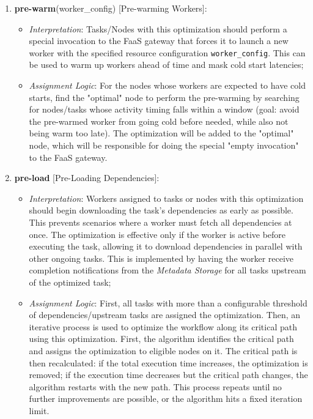 \begin{enumerate}
\item\textbf{pre-warm}(worker\_config) [Pre-warming Workers]:
\begin{itemize}
  \item \textit{Interpretation}: Tasks/Nodes with this optimization should perform a special invocation to the FaaS gateway that forces it to launch a new worker with the specified resource configuration \texttt{worker\_config}. This can be used to warm up workers ahead of time and mask cold start latencies;
  \item \textit{Assignment Logic}: For the nodes whose workers are expected to have cold starts, find the "optimal" node to perform the pre-warming by searching for nodes/tasks whose activity timing falls within a window (goal: avoid the pre-warmed worker from going cold before needed, while also not being warm too late). The optimization will be added to the "optimal" node, which will be responsible for doing the special "empty invocation" to the FaaS gateway.
\end{itemize}

\item\textbf{pre-load} [Pre-Loading Dependencies]:
\begin{itemize}
  \item \textit{Interpretation}: Workers assigned to tasks or nodes with this optimization should begin downloading the task's dependencies as early as possible. This prevents scenarios where a worker must fetch all dependencies at once. The optimization is effective only if the worker is active before executing the task, allowing it to download dependencies in parallel with other ongoing tasks. This is implemented by having the worker receive completion notifications from the \textit{Metadata Storage} for all tasks upstream of the optimized task;
  \item \textit{Assignment Logic}: First, all tasks with more than a configurable threshold of dependencies/upstream tasks are assigned the optimization. Then, an iterative process is used to optimize the workflow along its critical path using this optimization. First, the algorithm identifies the critical path and assigns the optimization to eligible nodes on it. The critical path is then recalculated: if the total execution time increases, the optimization is removed; if the execution time decreases but the critical path changes, the algorithm restarts with the new path. This process repeats until no further improvements are possible, or the algorithm hits a fixed iteration limit.
\end{itemize}


\end{enumerate}
